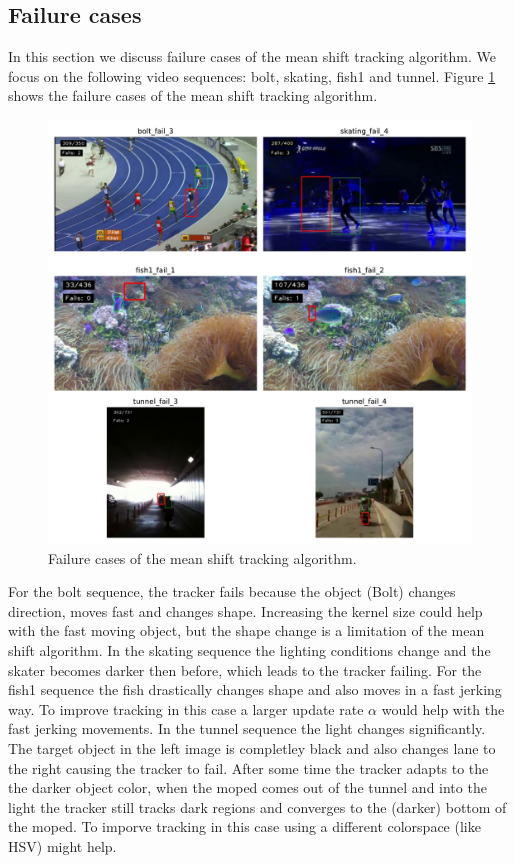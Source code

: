 \documentclass[9pt]{IEEEtran}
\begin{document}
\subsection*{Failure cases}
In this section we discuss failure cases of the mean shift tracking algorithm.
We focus on the following video sequences: bolt, skating, fish1 and tunnel.
Figure \ref{fig:failures} shows the failure cases of the mean shift tracking algorithm.
\begin{figure}[h]
    \centering
    \includegraphics[width=1\columnwidth]{failures.pdf}
    \caption{Failure cases of the mean shift tracking algorithm.}
    \label{fig:failures}
\end{figure}

For the bolt sequence, the tracker fails because the object (Bolt) changes direction, moves fast and changes shape.
Increasing the kernel size could help with the fast moving object, but the shape change is a limitation of the mean shift algorithm.
In the skating sequence the lighting conditions change and the skater becomes darker then before, which leads to the tracker failing.
For the fish1 sequence the fish drastically changes shape and also moves in a fast jerking way.
To improve tracking in this case a larger update rate $\alpha$ would help with the fast jerking movements.
In the tunnel sequence the light changes significantly.
The target object in the left image is completley black and also changes lane to the right causing the tracker to fail.
After some time the tracker adapts to the the darker object color, when the moped comes out of the tunnel and into the light the tracker still tracks dark regions and converges to the (darker) bottom of the moped.
To imporve tracking in this case using a different colorspace (like HSV) might help.
\end{document}
